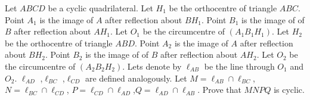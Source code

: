 Let $ABCD$ be a cyclic quadrilateral. Let $H_{1}$ be the orthocentre of triangle $ABC$. Point $A_{1}$ is the image of $A$ after reflection about $BH_{1}$. Point $B_{1}$ is the image of of $B$ after reflection about $AH_{1}$. Let $O_{1}$ be the circumcentre of $(A_{1}B_{1}H_{1})$. Let $H_{2}$ be the orthocentre of triangle $ABD$. Point $A_{2}$ is the image of $A$ after reflection about $BH_{2}$. Point $B_{2}$ is the image of of $B$ after reflection about $AH_{2}$. Let $O_{2}$ be the circumcentre of $(A_{2}B_{2}H_{2})$. Lets denote by $\ell_{AB}$ be the line through $O_{1}$ and $O_{2}$. $\ell_{AD}$ ,$\ell_{BC}$ ,$\ell_{CD}$  are defined analogously. Let $M=\ell_{AB} \cap \ell_{BC}$, $N=\ell_{BC} \cap \ell_{CD}$, $P=\ell_{CD} \cap \ell_{AD}$,$Q=\ell_{AD} \cap \ell_{AB}$. Prove that $MNPQ$ is cyclic.